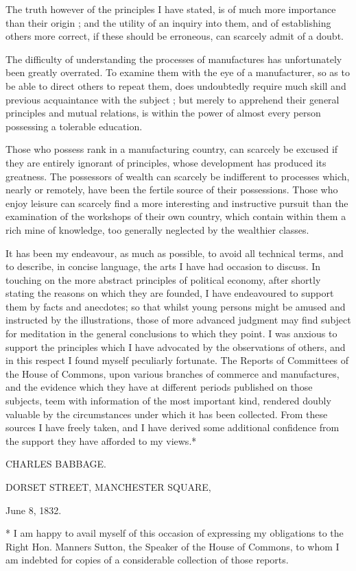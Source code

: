 \documentclass{article}
\begin{document}
The truth however of the principles I have stated, is of much more importance than their origin ; and the utility of an inquiry into them, and of establishing others more correct, if these should be erroneous, can scarcely admit of a doubt.


The difficulty of understanding the processes of manufactures has unfortunately been greatly overrated. To examine them with the eye of a manufacturer, so as to be able to direct others to repeat them, does undoubtedly require much skill and previous acquaintance with the subject ; but merely to apprehend their general principles and mutual relations, is within the power of almost every person possessing a tolerable education.


Those who possess rank in a manufacturing country, can scarcely be excused if they are entirely ignorant of principles, whose development has produced its greatness. The possessors of wealth can scarcely be indifferent to processes which, nearly or remotely, have been the fertile source of their possessions. Those who enjoy leisure can scarcely find a more interesting and instructive pursuit than the examination of the workshops of their own country, which contain within them a rich mine of knowledge, too generally neglected by the wealthier classes.


It has been my endeavour, as much as possible, to avoid all technical terms, and to describe, in concise language, the arts I have had occasion to discuss. In touching on the more abstract principles of political economy, after shortly stating the reasons on which they are founded, I have endeavoured to support them by facts and anecdotes; so that whilst young persons might be amused and instructed by the illustrations, those of more advanced judgment may find subject for meditation in the general conclusions to which they point. I was anxious to support the principles which I have advocated by the observations of others, and in this respect I found myself peculiarly fortunate. The Reports of Committees of the House of Commons, upon various branches of commerce and manufactures, and the evidence which they have at different periods published on those subjects, teem with information of the most important kind, rendered doubly valuable by the circumstances under which it has been collected. From these sources I have freely taken, and I have derived some additional confidence from the support they have afforded to my views.*


CHARLES BABBAGE.


DORSET STREET, MANCHESTER SQUARE, 


June 8, 1832.


* I am happy to avail myself of this occasion of expressing my obligations to the Right Hon. Manners Sutton, the Speaker of the House of Commons, to whom I am indebted for copies of a considerable collection of those reports.
\end{document}
